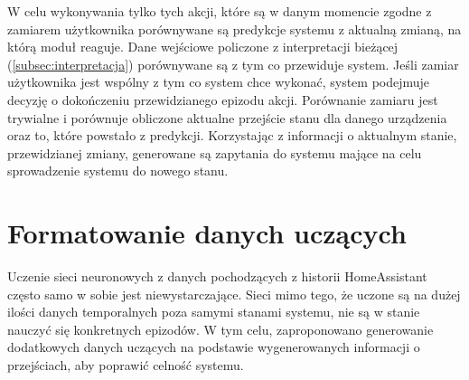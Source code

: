 W celu wykonywania tylko tych akcji, które są w danym momencie zgodne z zamiarem użytkownika porównywane są predykcje systemu z aktualną zmianą, na którą moduł reaguje. Dane wejściowe policzone z interpretacji bieżącej (\ref{subsec:interpretacja}) porównywane są z tym co przewiduje system. Jeśli zamiar użytkownika jest wspólny z tym co system chce wykonać, system podejmuje decyzję o dokończeniu przewidzianego epizodu akcji. Porównanie zamiaru jest trywialne i porównuje obliczone aktualne przejście stanu dla danego urządzenia oraz to, które powstało z predykcji. Korzystając z informacji o aktualnym stanie, przewidzianej zmiany, generowane są zapytania do systemu mające na celu sprowadzenie systemu do nowego stanu.

\section{Formatowanie danych uczących} \label{sec:dane_uczace}
Uczenie sieci neuronowych z danych pochodzących z historii HomeAssistant często samo w sobie jest niewystarczające. Sieci mimo tego, że uczone są na dużej ilości danych temporalnych poza samymi stanami systemu, nie są w stanie nauczyć się konkretnych epizodów. W tym celu, zaproponowano generowanie dodatkowych danych uczących na podstawie wygenerowanych informacji o przejściach, aby poprawić celność systemu.

